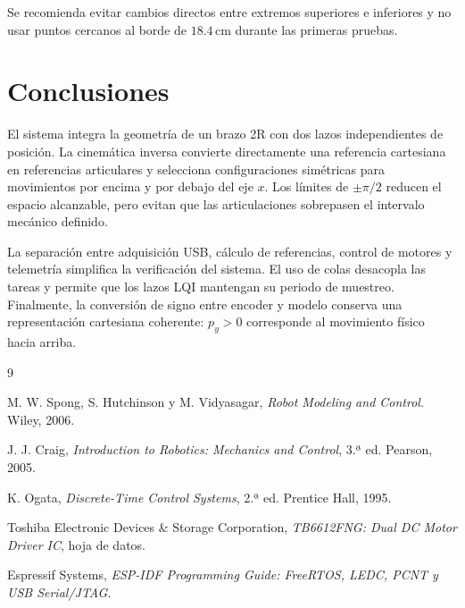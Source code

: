 \documentclass[11pt,a4paper]{article}
\begin{document}
Se recomienda evitar cambios directos entre extremos superiores e inferiores y no usar puntos cercanos al borde de $18.4\,\mathrm{cm}$ durante las primeras pruebas.

\section{Conclusiones}

El sistema integra la geometría de un brazo 2R con dos lazos independientes de posición. La cinemática inversa convierte directamente una referencia cartesiana en referencias articulares y selecciona configuraciones simétricas para movimientos por encima y por debajo del eje $x$. Los límites de $\pm\pi/2$ reducen el espacio alcanzable, pero evitan que las articulaciones sobrepasen el intervalo mecánico definido.

La separación entre adquisición USB, cálculo de referencias, control de motores y telemetría simplifica la verificación del sistema. El uso de colas desacopla las tareas y permite que los lazos LQI mantengan su periodo de muestreo. Finalmente, la conversión de signo entre encoder y modelo conserva una representación cartesiana coherente: $p_y>0$ corresponde al movimiento físico hacia arriba.

\begin{thebibliography}{9}

M. W. Spong, S. Hutchinson y M. Vidyasagar,
\textit{Robot Modeling and Control}.
Wiley, 2006.

J. J. Craig,
\textit{Introduction to Robotics: Mechanics and Control}, 3.ª ed.
Pearson, 2005.

K. Ogata,
\textit{Discrete-Time Control Systems}, 2.ª ed.
Prentice Hall, 1995.

Toshiba Electronic Devices \& Storage Corporation,
\textit{TB6612FNG: Dual DC Motor Driver IC}, hoja de datos.

Espressif Systems,
\textit{ESP-IDF Programming Guide: FreeRTOS, LEDC, PCNT y USB Serial/JTAG}.

\end{thebibliography}
\end{document}
